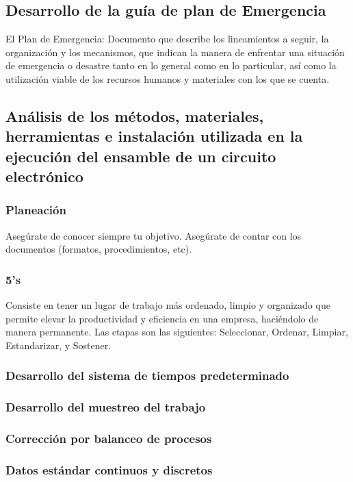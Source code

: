    \subsection{Desarrollo de la guía de plan de Emergencia}
    
    El Plan de Emergencia: Documento que describe los lineamientos a seguir, la organización y los mecanismos, que indican la manera de enfrentar una situación de emergencia o desastre tanto en lo general como en lo particular, así como la utilización viable de los recursos humanos y materiales con los que se cuenta.
    \subsection{Análisis de los métodos, materiales, herramientas e instalación utilizada en la ejecución del ensamble de un circuito electrónico}
    
    \subsubsection{Planeación}
    
    Asegúrate de conocer siempre tu objetivo.
    Asegúrate de contar con los documentos (formatos, procedimientos, etc).
    \subsubsection{5's}
    
    Consiste en tener un lugar de trabajo
    más ordenado, limpio y organizado que
    permite elevar la productividad y
    eficiencia en una empresa, haciéndolo de manera permanente.
    Las etapas son las siguientes: Seleccionar, Ordenar, Limpiar, Estandarizar, y Sostener.
    \subsubsection{Desarrollo del sistema de tiempos predeterminado}
    \subsubsection{Desarrollo del muestreo del trabajo}
    \subsubsection{Corrección por balanceo de procesos}
    \subsubsection{Datos estándar continuos y discretos}
    
